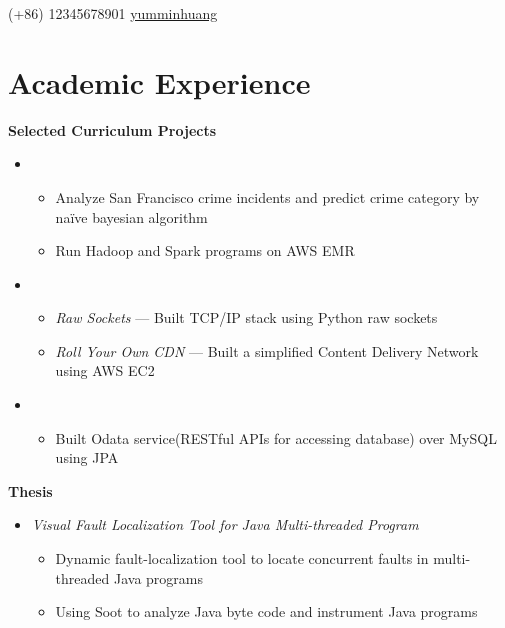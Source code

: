\documentclass{resume}
\begin{document}


{(+86) 12345678901}
{\href{https://github.com/yumminhuang}{yumminhuang}}

%
%

\section{Academic Experience}

\textbf{Selected Curriculum Projects}
\begin{itemize}
\item {}
\begin{itemize}
\item Analyze San Francisco crime incidents and predict crime category by na\"{i}ve bayesian algorithm
\item Run Hadoop and Spark programs on AWS EMR
\end{itemize}

\item {}
\begin{itemize}
\item \textit{Raw Sockets} --- Built TCP/IP stack using Python raw sockets
\item \textit{Roll Your Own CDN} --- Built a simplified Content Delivery Network using AWS EC2
\end{itemize}

\item {}
\begin{itemize}
\item Built Odata service(RESTful APIs for accessing database) over MySQL using JPA
\end{itemize}
\end{itemize}

\textbf{Thesis}
\begin{itemize}
\item \textit{Visual Fault Localization Tool for Java Multi-threaded Program}
\begin{itemize}
\item Dynamic fault-localization tool to locate concurrent faults in multi-threaded Java programs
\item Using Soot to analyze Java byte code and instrument Java programs
\end{itemize}
\end{itemize}
\end{document}
